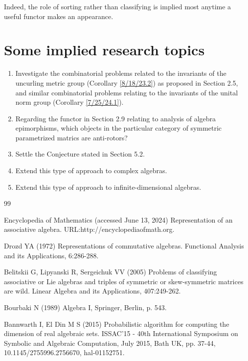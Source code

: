 \documentclass{amsart}
\numberwithin{equation}{section}
\theoremstyle{definition}
\numberwithin{theorem}{section}
\begin{document}
{Indeed, the role of sorting rather than classifying is implied most anytime a useful functor makes an appearance.

\vspace{.75cm}

\section{Some implied research topics} 
\begin{enumerate} \item Investigate the combinatorial problems related to the invariants of the uncurling metric group (Corollary \ref{8/18/23.2}) as proposed in Section 2.5, and similar combinatorial problems relating to the invariants of the unital norm group (Corollary \ref{7/25/24.1}). \item Regarding the functor in Section 2.9 relating to analysis of algebra epimorphisms, which objects in the particular category of symmetric parametrized matrics are anti-rotors? \item Settle the Conjecture stated in Section 5.2. \item Extend this type of approach to complex algebras. \item Extend this type of approach to infinite-dimensional algebras.  \end{enumerate}
  
 \vspace{.75cm}
  
   \begin{thebibliography}{99}
   
 Encyclopedia of Mathematics (accessed June 13, 2024) Representation of an associative algebra. URL:http://encyclopediaofmath.org.
   
     Drozd YA (1972) Representations of commutative algebras. Functional Analysis and its Applications, 6:286-288.
          
        Belitskii G, Lipyanski R, Sergeichuk VV (2005) Problems of classifying associative or Lie algebras and triples of symmetric or skew-symmetric matrices are wild.  Linear Algebra and its Applications, 407:249-262.
       
               Bourbaki N (1989) Algebra I, Springer, Berlin, p. 543.

               
        Bannwarth I, El Din M S (2015) Probabilistic algorithm for computing the dimension of real algebraic sets.  ISSAC'15 - 40th International Symposium on Symbolic and Algebraic Computation, July 2015, Bath UK, pp. 37-44, 10.1145/2755996.2756670, hal-01152751.
       

\end{thebibliography}}
\end{document}

